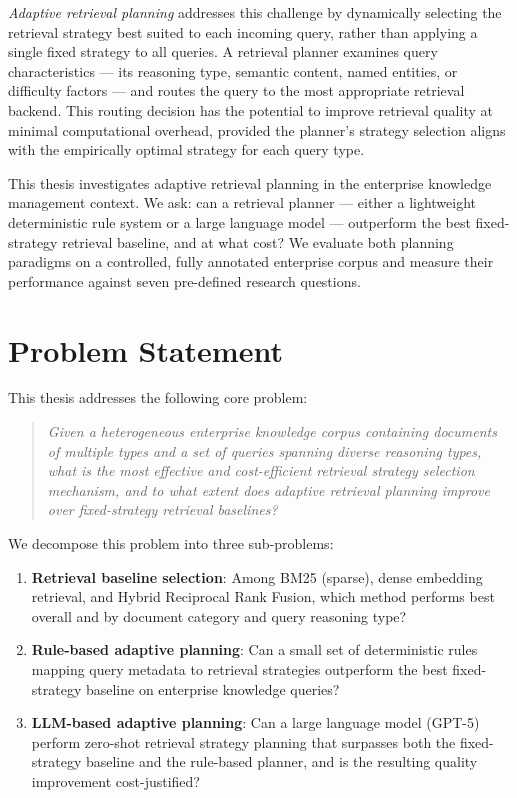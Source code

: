\emph{Adaptive retrieval planning} addresses this challenge by dynamically selecting the retrieval strategy best suited to each incoming query, rather than applying a single fixed strategy to all queries. A retrieval planner examines query characteristics --- its reasoning type, semantic content, named entities, or difficulty factors --- and routes the query to the most appropriate retrieval backend. This routing decision has the potential to improve retrieval quality at minimal computational overhead, provided the planner's strategy selection aligns with the empirically optimal strategy for each query type.

This thesis investigates adaptive retrieval planning in the enterprise knowledge management context. We ask: can a retrieval planner --- either a lightweight deterministic rule system or a large language model --- outperform the best fixed-strategy retrieval baseline, and at what cost? We evaluate both planning paradigms on a controlled, fully annotated enterprise corpus and measure their performance against seven pre-defined research questions.

\section{Problem Statement}
\label{sec:intro_problem}

This thesis addresses the following core problem:

\begin{quote}
\textit{Given a heterogeneous enterprise knowledge corpus containing documents of multiple types and a set of queries spanning diverse reasoning types, what is the most effective and cost-efficient retrieval strategy selection mechanism, and to what extent does adaptive retrieval planning improve over fixed-strategy retrieval baselines?}
\end{quote}

We decompose this problem into three sub-problems:

\begin{enumerate}
    \item \textbf{Retrieval baseline selection}: Among BM25 (sparse), dense embedding retrieval, and Hybrid Reciprocal Rank Fusion, which method performs best overall and by document category and query reasoning type?
    \item \textbf{Rule-based adaptive planning}: Can a small set of deterministic rules mapping query metadata to retrieval strategies outperform the best fixed-strategy baseline on enterprise knowledge queries?
    \item \textbf{LLM-based adaptive planning}: Can a large language model (GPT-5) perform zero-shot retrieval strategy planning that surpasses both the fixed-strategy baseline and the rule-based planner, and is the resulting quality improvement cost-justified?
\end{enumerate}

